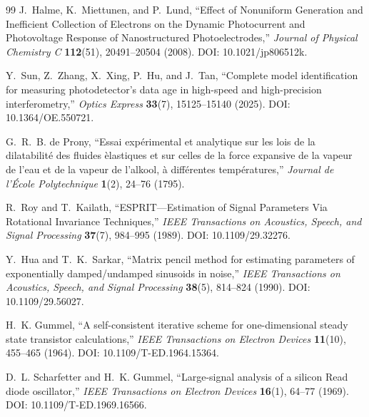 \documentclass[11pt]{article}
\begin{document}
\begin{thebibliography}{99}
J.~Halme, K.~Miettunen, and P.~Lund, ``Effect of Nonuniform Generation and Inefficient Collection of Electrons on the Dynamic Photocurrent and Photovoltage Response of Nanostructured Photoelectrodes,'' \emph{Journal of Physical Chemistry C} \textbf{112}(51), 20491--20504 (2008). DOI: 10.1021/jp806512k.

Y.~Sun, Z.~Zhang, X.~Xing, P.~Hu, and J.~Tan, ``Complete model identification for measuring photodetector's data age in high-speed and high-precision interferometry,'' \emph{Optics Express} \textbf{33}(7), 15125--15140 (2025). DOI: 10.1364/OE.550721.

G.~R.~B. de Prony, ``Essai exp\'erimental et analytique sur les lois de la dilatabilit\'e des fluides \`elastiques et sur celles de la force expansive de la vapeur de l'eau et de la vapeur de l'alkool, \`a diff\'erentes temp\'eratures,'' \emph{Journal de l'\'Ecole Polytechnique} \textbf{1}(2), 24--76 (1795).

R.~Roy and T.~Kailath, ``ESPRIT---Estimation of Signal Parameters Via Rotational Invariance Techniques,'' \emph{IEEE Transactions on Acoustics, Speech, and Signal Processing} \textbf{37}(7), 984--995 (1989). DOI: 10.1109/29.32276.

Y.~Hua and T.~K.~Sarkar, ``Matrix pencil method for estimating parameters of exponentially damped/undamped sinusoids in noise,'' \emph{IEEE Transactions on Acoustics, Speech, and Signal Processing} \textbf{38}(5), 814--824 (1990). DOI: 10.1109/29.56027.

H.~K. Gummel, ``A self-consistent iterative scheme for one-dimensional steady state transistor calculations,'' \emph{IEEE Transactions on Electron Devices} \textbf{11}(10), 455--465 (1964). DOI: 10.1109/T-ED.1964.15364.

D.~L. Scharfetter and H.~K. Gummel, ``Large-signal analysis of a silicon Read diode oscillator,'' \emph{IEEE Transactions on Electron Devices} \textbf{16}(1), 64--77 (1969). DOI: 10.1109/T-ED.1969.16566.

\end{thebibliography}
\end{document}
